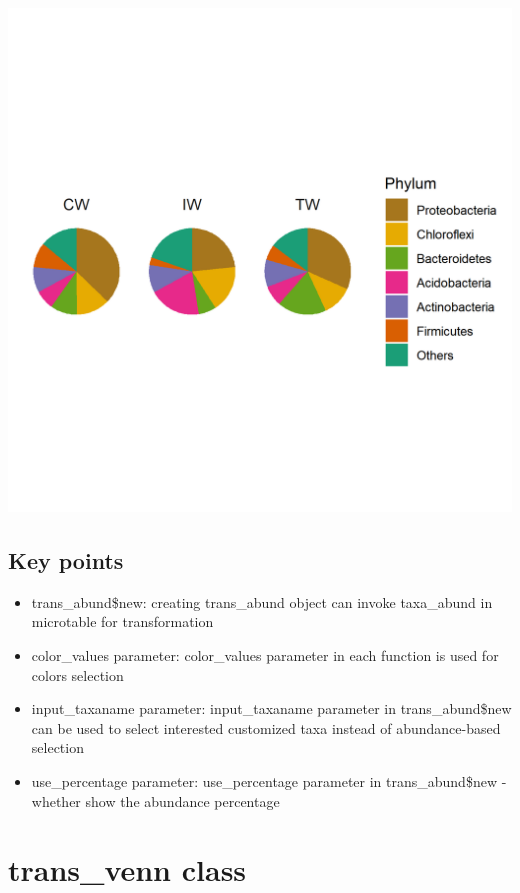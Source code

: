 \documentclass[
]{book}
\providecommand{\tightlist}{%
  \setlength{\itemsep}{0pt}\setlength{\parskip}{0pt}}
\begin{document}
\begin{center}\includegraphics[width=600px]{Images/plot_pie} \end{center}

\hypertarget{key-points-1}{%
\subsection{Key points}\label{key-points-1}}

\begin{itemize}
\tightlist
\item
  trans\_abund\$new: creating trans\_abund object can invoke taxa\_abund in microtable for transformation
\item
  color\_values parameter: color\_values parameter in each function is used for colors selection
\item
  input\_taxaname parameter: input\_taxaname parameter in trans\_abund\$new can be used to select interested customized taxa instead of abundance-based selection
\item
  use\_percentage parameter: use\_percentage parameter in trans\_abund\$new - whether show the abundance percentage
\end{itemize}

\hypertarget{trans_venn-class}{%
\section{trans\_venn class}\label{trans_venn-class}}
\end{document}
